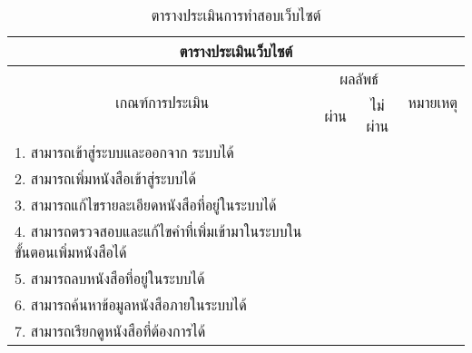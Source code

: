 \begin{table}[H]
\caption{ตารางประเมินการทำสอบเว็บไซต์}\label{tbl:test}
\begin{tabular}{|l|l|l|l|}
\hline
\multicolumn{4}{|c|}{ตารางประเมินเว็บไซต์}                                                                                                                                             \\ \hline
\multicolumn{1}{|c|}{\multirow{2}{*}{เกณฑ์การประเมิน}}                  & \multicolumn{2}{c|}{ผลลัพธ์}                             & \multicolumn{1}{c|}{\multirow{2}{*}{หมายเหตุ}} \\ \cline{2-3}
\multicolumn{1}{|c|}{}                                                  & \multicolumn{1}{c|}{ผ่าน} & \multicolumn{1}{c|}{ไม่ผ่าน} & \multicolumn{1}{c|}{}                          \\ \hline
1. สามารถเข้าสู่ระบบและออกจาก ระบบได้                                   &                           &                              &                                                \\ \hline
2. สามารถเพิ่มหนังสือเข้าสู่ระบบได้                                      &                           &                              &                                                \\ \hline
3. สามารถแก้ไขรายละเอียดหนังสือที่อยู่ในระบบได้                          &                           &                              &                                                \\ \hline
4.   สามารถตรวจสอบและแก้ไขคำที่เพิ่มเข้ามาในระบบในขั้นตอนเพิ่มหนังสือได้ &                           &                              &                                                \\ \hline
5. สามารถลบหนังสือที่อยู่ในระบบได้                                       &                           &                              &                                                \\ \hline
6.   สามารถค้นหาข้อมูลหนังสือภายในระบบได้                                &                           &                              &                                                \\ \hline
7.   สามารถเรียกดูหนังสือที่ต้องการได้                                   &                           &                              &                                                \\ \hline
\end{tabular}
\end{table}